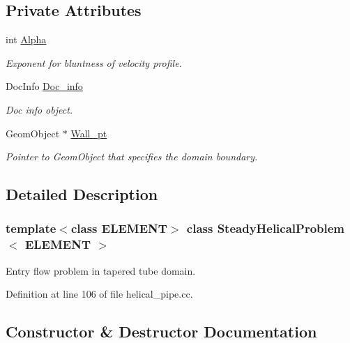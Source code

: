 \subsection*{Private Attributes}
\begin{DoxyCompactItemize}
\item 
int \hyperlink{classSteadyHelicalProblem_ae4357e3857463d21083f82a821aac10b}{Alpha}
\begin{DoxyCompactList}\small\item\em Exponent for bluntness of velocity profile. \end{DoxyCompactList}\item 
Doc\+Info \hyperlink{classSteadyHelicalProblem_a2b9bd1b93bad29a341e1718599a8a445}{Doc\+\_\+info}
\begin{DoxyCompactList}\small\item\em Doc info object. \end{DoxyCompactList}\item 
Geom\+Object $\ast$ \hyperlink{classSteadyHelicalProblem_a3ac6dc4f62f8ecadd4d6016b55af249a}{Wall\+\_\+pt}
\begin{DoxyCompactList}\small\item\em Pointer to Geom\+Object that specifies the domain boundary. \end{DoxyCompactList}\end{DoxyCompactItemize}


\subsection{Detailed Description}
\subsubsection*{template$<$class E\+L\+E\+M\+E\+NT$>$\newline
class Steady\+Helical\+Problem$<$ E\+L\+E\+M\+E\+N\+T $>$}

Entry flow problem in tapered tube domain. 

Definition at line 106 of file helical\+\_\+pipe.\+cc.



\subsection{Constructor \& Destructor Documentation}
\mbox{\label{classSteadyHelicalProblem_adbf13f3b2ffbcaaef6465d0d6583a1c9}} 
